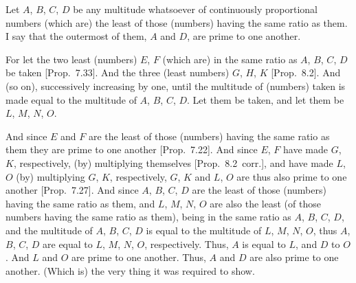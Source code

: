 \begin{Parallel}{}{}
{\epsfysize=2in
\centerline{}

 Let $A$, $B$, $C$, $D$ be  any multitude whatsoever of continuously proportional
numbers (which are)  the least of those (numbers) having the same ratio as them. I say that the outermost of them, $A$ and $D$, are prime to
one another.

For let the two 
least (numbers) $E$, $F$ (which are) in the same ratio as $A$, $B$, $C$,
$D$
be taken [Prop.~7.33]. And the three
(least numbers) $G$, $H$, $K$ [Prop.~8.2].
And (so on), successively increasing by one, until the multitude of
(numbers) taken is made equal to the multitude of $A$, $B$, $C$,  $D$.
Let them be taken, and let them be $L$, $M$, $N$,  $O$.

And since $E$ and $F$ are the least of those (numbers) having the
same ratio as them they are prime to one another [Prop.~7.22]. And since  $E$, $F$ have made
 $G$,  $K$, respectively, (by) multiplying themselves [Prop.~8.2~corr.], and  have made $L$,  $O$ 
(by) multiplying  $G$, $K$, respectively,  $G$, $K$ and $L$, $O$ are thus
 also prime to one another [Prop.~7.27]. 
And since $A$, $B$, $C$, $D$ are the least of those (numbers) having
the same ratio as them, and $L$, $M$, $N$,  $O$ are also the
least (of those numbers having the same ratio as them), being in the
same ratio as $A$, $B$, $C$, $D$, and the
multitude of $A$, $B$, $C$,  $D$ is equal to the multitude
of $L$, $M$, $N$,  $O$,  thus $A$, $B$, $C$,  $D$ are
equal to  $L$, $M$, $N$,  $O$, respectively. Thus, $A$ is equal to $L$, and $D$ to $O$. And $L$ and $O$ are prime to one another. Thus,
$A$ and $D$ are also prime to one another. (Which is) the very thing it was required to show.}
\end{Parallel}

